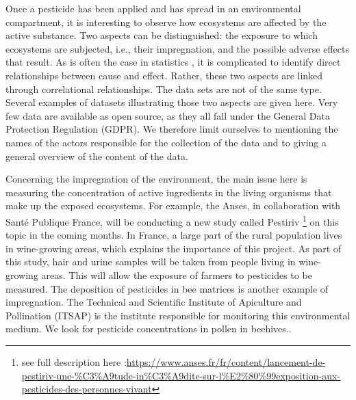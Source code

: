Once a pesticide has been applied and has spread in an environmental compartment, it is interesting to observe how ecosystems are affected by the active substance. Two aspects can be distinguished: the exposure to which ecosystems are subjected, i.e., their impregnation, and the possible adverse effects that result. As is often the case in statistics \cite{shipley2016}, it is complicated to identify direct relationships between cause and effect. Rather, these two aspects are linked through correlational relationships. The data sets are not of the same type. Several examples of datasets illustrating those two aspects are given here. Very few data are available as open source, as they all fall under the General Data Protection Regulation (GDPR). We therefore limit ourselves to mentioning the names of the actors responsible for the collection of the data and to giving a general overview of the content of the data.

Concerning the impregnation of the environment, the main issue here is measuring the concentration of active ingredients in the living organisms that make up the exposed ecosystems. For example, the Anses, in collaboration with Santé Publique France, will be conducting a new study called Pestiriv \footnote{see full description here :\url{https://www.anses.fr/fr/content/lancement-de-pestiriv-une-\%C3\%A9tude-in\%C3\%A9dite-sur-l\%E2\%80\%99exposition-aux-pesticides-des-personnes-vivant}} on this topic in the coming months. In France, a large part of the rural population lives in wine-growing areas, which explains the importance of this project. As part of this study, hair and urine samples will be taken from people living in wine-growing areas. This will allow the exposure of farmers to pesticides to be measured. The deposition of pesticides in bee matrices is another example of impregnation. The Technical and Scientific Institute of Apiculture and Pollination (ITSAP) is the institute responsible for monitoring this environmental medium. We look for pesticide concentrations in pollen in beehives..

